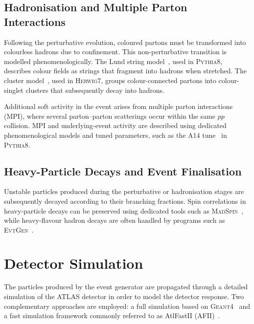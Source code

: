 \subsection*{Hadronisation and Multiple Parton Interactions}

Following the perturbative evolution, coloured partons must be transformed into colourless hadrons due to confinement. 
This non-perturbative transition is modelled phenomenologically. 
The Lund string model~\cite{Andersson1983LundString}, used in \textsc{Pythia8}, describes colour fields as strings that fragment into hadrons when stretched. 
The cluster model~\cite{Gieseke2017ClusterModel}, used in \textsc{Herwig7}, groups colour-connected partons into colour-singlet clusters that subsequently decay into hadrons.

Additional soft activity in the event arises from multiple parton interactions (MPI), where several parton--parton scatterings occur within the same $pp$ collision. 
MPI and underlying-event activity are described using dedicated phenomenological models and tuned parameters, such as the A14 tune~\cite{ATLAS2014A14Tune} in \textsc{Pythia8}.

\subsection*{Heavy-Particle Decays and Event Finalisation}

Unstable particles produced during the perturbative or hadronisation stages are subsequently decayed according to their branching fractions. 
Spin correlations in heavy-particle decays can be preserved using dedicated tools such as \textsc{MadSpin}~\cite{Frixione2007MadSpinCorrelations,Artoisenet2013MadSpin}, while heavy-flavour hadron decays are often handled by programs such as \textsc{EvtGen}~\cite{Lange2001EvtGen}. 


\section{Detector Simulation}

The particles produced by the event generator are propagated through a detailed simulation of the ATLAS detector in order to model the detector response. 
Two complementary approaches are employed: a full simulation based on \textsc{Geant4}~\cite{Agostinelli2003Geant4} and a fast simulation framework commonly referred to as AtlFastII (AFII)~\cite{ATLAS2010AFII}.

